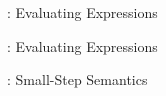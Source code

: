 
\begin{figure}
    
    \caption{\svl: Evaluating Expressions}
\end{figure}

\begin{figure}
    \boxed{\evalphi \phi}
    
    \caption{\svl: Evaluating Expressions}
\end{figure}

\begin{figure}
    
    \caption{\svl: Small-Step Semantics}
\end{figure}